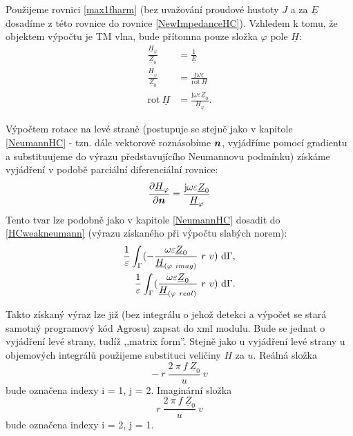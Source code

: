 \documentclass[12pt,a4paper,oneside]{article}
\numberwithin{equation}{section} %
\numberwithin{figure}{section} %
\numberwithin{table}{section} %
\newcommand{\mj}{\mathrm{j}} %
\renewcommand{\vec}[1]{\mbox{\boldmath$#1$}} %
\newcommand{\faz}[1]{{\underline{#1}}} %
\newcommand{\rot}{\mathrm{rot}\ }
\begin{document}
Použijeme rovnici \ref{max1fharm} (bez uvažování proudové hustoty $J$ a za $\faz{E}$ dosadíme z této rovnice do rovnice \ref{NewImpedanceHC}). Vzhledem k tomu, že objektem výpočtu je TM vlna, bude přítomna pouze složka $\varphi$ pole $\faz{H}$:
\begin{subequations}
\begin{align}
\frac{\faz{H} _{\varphi}}{\faz{Z} _0} &= \frac{1}{\faz{E}}
\\
\frac{\faz{H} _{\varphi}}{\faz{Z} _0} &= \frac{\mj \omega \varepsilon}{\rot \! \faz{H}}
\\
\rot \! \faz{H} &= \frac{\mj \omega \varepsilon \faz{Z} _0}{\faz{H} _{\varphi}} .
\end{align}
\end{subequations}

Výpočtem rotace na levé straně (postupuje se stejně jako v kapitole \ref{NeumannHC} - tzn. dále vektorově roznásobíme $\vec{n}$, vyjádříme pomocí gradientu a substituujeme do výrazu představujícího Neumannovu podmínku) získáme vyjádření v podobě parciální diferenciální rovnice:
\begin{equation}
\frac{\partial \faz{H} _{\varphi}}{\partial \vec{n}} = \frac{\mj \omega \varepsilon \faz{Z} _0}{\faz{H} _{\varphi}}
\end{equation}
Tento tvar lze podobně jako v kapitole \ref{NeumannHC} dosadit do \ref{HCweakneumann} (výrazu získaného při výpočtu slabých norem):
\begin{subequations}
\begin{align}
\frac{1}{\varepsilon} \int _{\Gamma} ( - \frac{\omega \varepsilon \faz{Z} _0}{\faz{H} _{(\varphi ~ imag)}} ~ r ~ v ) ~ \ud \Gamma ,
\\ 
\frac{1}{\varepsilon} \int _{\Gamma} ( \frac{\omega \varepsilon \faz{Z} _0}{\faz{H} _{(\varphi ~ real)}} ~ r ~ v ) ~ \ud \Gamma .
\end{align}
\end{subequations}

Takto získaný výraz lze již (bez integrálu o jehož detekci a výpočet se stará samotný programový kód Agrosu) zapsat do xml modulu. Bude se jednat o vyjádření levé strany, tudíž ,,matrix form''. Stejně jako u vyjádření levé strany u objemových integrálů použijeme substituci veličiny $H$ za $u$. Reálná složka 
\begin{equation}
- ~ r ~ \frac{2 ~ \pi ~ f ~ \faz{Z} _0}{u} ~ v
\end{equation} 
bude označena indexy i = 1, j = 2. Imaginární složka 
\begin{equation}
r ~ \frac{2 ~ \pi ~ f ~ \faz{Z} _0}{u} ~ v
\end{equation}
bude označena indexy i = 2, j = 1.
\end{document}

